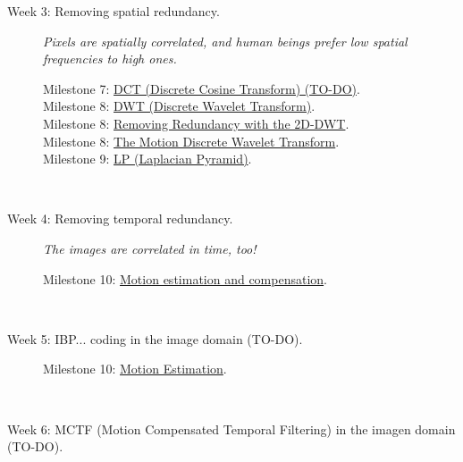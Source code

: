 \begin{description}
\item [Week 3: {\normalfont Removing spatial redundancy.}]
  \emph{Pixels are spatially correlated, and human beings prefer low
    spatial frequencies to high ones.}
  \begin{description}
  \item [Milestone 7: {\normalfont \href{}{DCT (Discrete Cosine Transform) (TO-DO)}.}] %
  \item [Milestone 8: {\normalfont \href{https://sistemas-multimedia.github.io/milestones/07-DWT/}{DWT (Discrete Wavelet Transform)}.}] %
  \item [Milestone 8: {\normalfont \href{https://sistemas-multimedia.github.io/milestones/08-2D-DWT/}{Removing Redundancy with the 2D-DWT}.}] %
  \item [Milestone 8: {\normalfont \href{https://sistemas-multimedia.github.io/milestones/09-MDWT/}{The Motion Discrete Wavelet Transform}.}] %
  \item [Milestone 9: {\normalfont \href{}{LP (Laplacian Pyramid)}.}]
  \end{description}
  ~\newline
\item [Week 4: {\normalfont Removing temporal redundancy.}] \emph{The images are correlated in time, too!}
  \begin{description}
  \item [Milestone 10: {\normalfont \href{https://sistemas-multimedia.github.io/milestones/10-ME/}{Motion estimation and compensation}.}]
  \end{description}
  ~\newline
\item [Week 5: {\normalfont IBP... coding in the image domain (TO-DO).}]
  \begin{description}
  \item [Milestone 10: {\normalfont \href{https://sistemas-multimedia.github.io/milestones/10-ME/}{Motion Estimation}.}] %
  \end{description}
  ~\newline
\item [Week 6: {\normalfont MCTF (Motion Compensated Temporal Filtering) in the imagen domain (TO-DO).}]
  ~\newline

\end{description}
